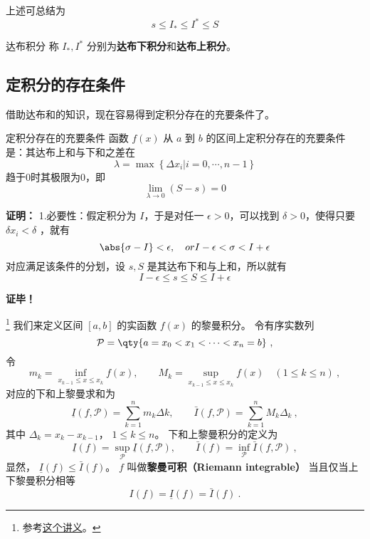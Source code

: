 上述可总结为
\begin{equation}
s\leq I_*\leq I^*\leq S
\end{equation}
\begin{definition}{达布积分}
称 $I_*,I^*$ 分别为\textbf{达布下积分}和\textbf{达布上积分}。
\end{definition}

\subsection{定积分的存在条件}

借助达布和的知识，现在容易得到定积分存在的充要条件了。
\begin{theorem}{定积分存在的充要条件}
函数 $f(x)$ 从 $a$ 到 $b$ 的区间上定积分存在的充要条件是：其达布上和与下和之差在
\begin{equation}
\lambda=\max \left\{\Delta x_i|i=0,\cdots,n-1 \right\} 
\end{equation}
趋于0时其极限为0，即
\begin{equation}
\lim_{\lambda\rightarrow0}(S-s)=0
\end{equation}
\end{theorem}
\textbf{证明：}
1.必要性：假定积分为 $I$，于是对任一 $\epsilon>0$，可以找到 $\delta>0$，使得只要 $\delta x_i<\delta$ ，就有
\begin{equation}
\abs{\sigma-I}<\epsilon,\quad or I-\epsilon<\sigma<I+\epsilon
\end{equation}
对应满足该条件的分划，设 $s,S$ 是其达布下和与上和，所以就有
\begin{equation}
I-\epsilon\leq s\leq S\leq I+\epsilon
\end{equation}


\textbf{证毕！}

\footnote{参考\href{https://math.berkeley.edu/~arveson/Dvi/105/note1.pdf}{这个讲义}。}
我们来定义区间 $[a, b]$ 的实函数 $f(x)$ 的黎曼积分。 令有序实数列
\begin{equation}
\mathcal P = \qty{a = x_0 < x_1 < \dots < x_n = b}~,
\end{equation}
令
\begin{equation}
m_k = \inf_{x_{k-1} \le x \le x_k} f(x), \qquad M_k = \sup_{x_{k-1} \le x \le x_k} f(x) \quad (1 \le k \le n)~,
\end{equation}
对应的下和上黎曼求和为
\begin{equation}
\underline I(f, \mathcal P) = \sum_{k = 1}^n m_k\Delta k, \qquad \bar I(f, \mathcal P) = \sum_{k = 1}^n M_k \Delta_k~,
\end{equation}
其中 $\Delta_k = x_k - x_{k-1}$， $1\le k\le n$。 下和上黎曼积分的定义为
\begin{equation}
\underline I(f) = \sup_{\mathcal P} \underline I(f, \mathcal P), \qquad \bar I(f) = \inf_{\mathcal P} \bar I(f, \mathcal P)~,
\end{equation}
显然， $\underline I(f) \le \bar I(f)$。 $f$ 叫做\textbf{黎曼可积（Riemann integrable）} 当且仅当上下黎曼积分相等
\begin{equation}
I(f) = \underline I(f) = \bar I(f)~.
\end{equation}

